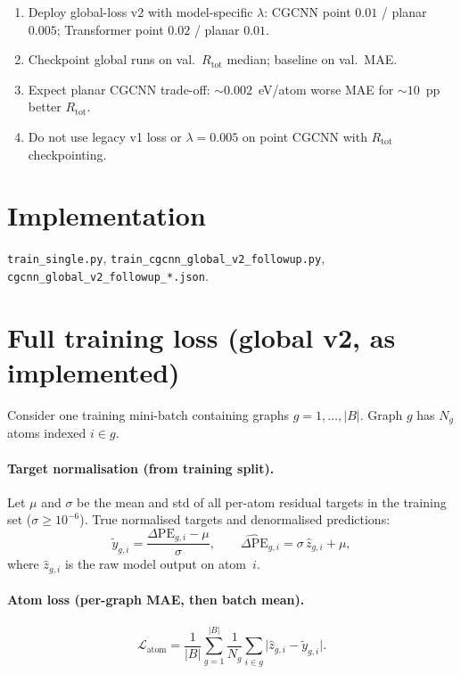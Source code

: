\documentclass[11pt,a4paper]{article}
\newcommand{\dPE}{\Delta\mathrm{PE}}
\newcommand{\dPEhat}{\widehat{\Delta\mathrm{PE}}}
\begin{document}
\begin{enumerate}
  \item Deploy global-loss v2 with model-specific $\lambda$:
    CGCNN point $0.01$ / planar $0.005$;
    Transformer point $0.02$ / planar $0.01$.
  \item Checkpoint global runs on val.\ $R_{\mathrm{tot}}$ median; baseline on val.\ MAE.
  \item Expect planar CGCNN trade-off: ${\sim}0.002$~eV/atom worse MAE for ${\sim}10$~pp better $R_{\mathrm{tot}}$.
  \item Do not use legacy v1 loss or $\lambda=0.005$ on point CGCNN with $R_{\mathrm{tot}}$ checkpointing.
\end{enumerate}

\section*{Implementation}

\texttt{train\_single.py}, \texttt{train\_cgcnn\_global\_v2\_followup.py}, \texttt{cgcnn\_global\_v2\_followup\_*.json}.

\appendix
\section{Full training loss (global v2, as implemented)}
\label{app:loss}

Consider one training mini-batch containing graphs $g=1,\ldots,|B|$. Graph $g$ has $N_g$ atoms indexed $i\in g$.

\paragraph{Target normalisation (from training split).}
Let $\mu$ and $\sigma$ be the mean and std of all per-atom residual targets in the training set ($\sigma\ge 10^{-6}$). True normalised targets and denormalised predictions:
\begin{equation}
  \tilde y_{g,i}=\frac{\dPE_{g,i}-\mu}{\sigma},
  \qquad
  \dPEhat_{g,i}=\sigma\,\hat z_{g,i}+\mu,
\end{equation}
where $\hat z_{g,i}$ is the raw model output on atom~$i$.

\paragraph{Atom loss (per-graph MAE, then batch mean).}
\begin{equation}
  \mathcal{L}_{\mathrm{atom}}
  = \frac{1}{|B|}\sum_{g=1}^{|B|}
    \frac{1}{N_g}\sum_{i\in g}
    \bigl|\hat z_{g,i}-\tilde y_{g,i}\bigr|.
\end{equation}
\end{document}

